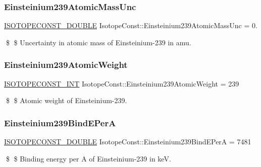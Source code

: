 \subsubsection{\texorpdfstring{Einsteinium239\+Atomic\+Mass\+Unc}{Einsteinium239AtomicMassUnc}}
{\footnotesize\ttfamily \mbox{\hyperlink{group___isotope_const-_macros_ga8f45a7272ce02c0b4c65c44636ed719a}{I\+S\+O\+T\+O\+P\+E\+C\+O\+N\+S\+T\+\_\+\+D\+O\+U\+B\+LE}} Isotope\+Const\+::\+Einsteinium239\+Atomic\+Mass\+Unc = 0.}

\$ \$ Uncertainty in atomic mass of Einsteinium-\/239 in amu. \mbox{\label{group___isotope_const-_einsteinium-_es239_gad4f7ed2dce673fab3153ec9b5596edca}} 
\subsubsection{\texorpdfstring{Einsteinium239\+Atomic\+Weight}{Einsteinium239AtomicWeight}}
{\footnotesize\ttfamily \mbox{\hyperlink{group___isotope_const-_macros_ga5f18360b3e99483a35c32d789e62621c}{I\+S\+O\+T\+O\+P\+E\+C\+O\+N\+S\+T\+\_\+\+I\+NT}} Isotope\+Const\+::\+Einsteinium239\+Atomic\+Weight = 239}

\$ \$ Atomic weight of Einsteinium-\/239. \mbox{\label{group___isotope_const-_einsteinium-_es239_ga334ca9a2fffc1effb23484610b3b2e2d}} 
\subsubsection{\texorpdfstring{Einsteinium239\+Bind\+E\+PerA}{Einsteinium239BindEPerA}}
{\footnotesize\ttfamily \mbox{\hyperlink{group___isotope_const-_macros_ga8f45a7272ce02c0b4c65c44636ed719a}{I\+S\+O\+T\+O\+P\+E\+C\+O\+N\+S\+T\+\_\+\+D\+O\+U\+B\+LE}} Isotope\+Const\+::\+Einsteinium239\+Bind\+E\+PerA = 7481}

\$ \$ Binding energy per A of Einsteinium-\/239 in keV. \mbox{\label{group___isotope_const-_einsteinium-_es239_gaadae5dca4ce5465c06da6b4f16a56c13}} 
